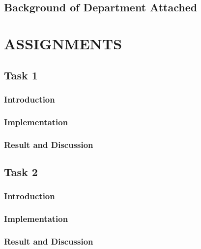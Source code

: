 \documentclass[l2pt]{report}
\begin{document}
\vspace{3cm}
\section{Background of Department Attached}       %




\chapter{ASSIGNMENTS}       %

\section{Task 1}       %

\subsection{Introduction}    %
\subsection{Implementation}    %
\subsection{Result and Discussion}    %

\section{Task 2}       %

\subsection{Introduction}    %
\subsection{Implementation}    %
\subsection{Result and Discussion}    %
\end{document}
